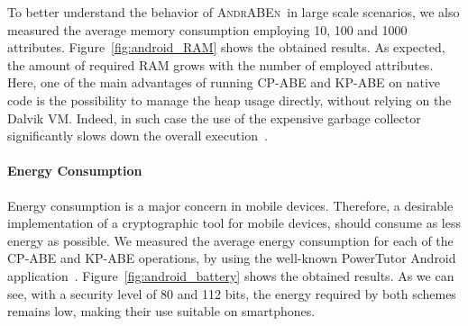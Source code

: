 \documentclass{sig-alternate-2013}
\newcommand{\andraben}{\textsc{AndrABEn}}
\begin{document}
To better understand the behavior of \andraben~in large scale scenarios, we also measured the average memory consumption employing 10, 100 and 1000 attributes. Figure~\ref{fig:android_RAM} shows the obtained results. As expected, the amount of required RAM grows with the number of employed attributes. Here, one of the main advantages of running CP-ABE and KP-ABE on native code is the possibility to manage the heap usage directly, without relying on the Dalvik VM. Indeed, in such case the use of the expensive garbage collector significantly slows down the overall execution~\cite{6654173}.

\paragraph{Energy Consumption} Energy consumption is a major concern in mobile devices. Therefore, a desirable implementation of a cryptographic tool for mobile devices, should consume as less energy as possible. We measured the average energy consumption for each of the CP-ABE and KP-ABE operations, by using the well-known PowerTutor Android application~\cite{powerTutor}. Figure~\ref{fig:android_battery} shows the obtained results. As we can see, with a security level of 80 and 112 bits, the energy required by both schemes remains low, making their use suitable on smartphones.
\end{document}
